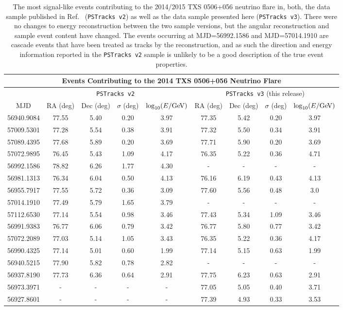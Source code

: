 \documentclass[aps,10pt,prd,twocolumn,floats,letterpaper,showpacs,nofootinbib,bibnotes,notitlepage,superscriptaddress,floatfix]{revtex4-1}
\newcommand{\MA}[1]{{\color{black}#1}}
\begin{document}
\begin{table}[p]
\centering
\begin{ruledtabular}
\begin{tabular}{c|cccc|cccc}
\multicolumn{9}{c}{Events Contributing to the 2014 TXS 0506+056 Neutrino Flare} \\[0.1cm]
\hline
\multicolumn{1}{c|}{} &
\multicolumn{4}{c|}{\MA{\tt PSTracks v2}~\cite{IceCube:2018cha,IceCube:2019}} & 
\multicolumn{4}{c}{\MA{\tt PSTracks v3} (this release)}\\[0.1cm]
MJD & RA (deg) & Dec (deg) & $\sigma$ (deg) & $\log_{10}(E/{\rm GeV})$ & RA (deg) & Dec (deg) & $\sigma$ (deg) & $\log_{10}(E/{\rm GeV})$\\ 
\hline
56940.9084 & 77.55 & 5.40 & 0.20 & 3.97 & 77.35 & 5.42 & 0.20 & 3.97\\
57009.5301 & 77.28 & 5.54 & 0.38 & 3.91 & 77.32 & 5.50 & 0.34 & 3.91\\
57089.4395 & 77.68 & 5.89 & 0.20 & 3.69 & 77.71 & 5.90 & 0.20 & 3.69\\
57072.9895 & 76.45 & 5.43 & 1.09 & 4.17 & 76.35 & 5.22 & 0.36 & 4.71\\
56992.1586 & 78.82 & 6.26 & 1.77 & 4.30 & - & - & - & - \\
56981.1313& 76.34 & 6.04 & 0.50 & 4.13 & 76.16 & 6.19 & 0.43 & 4.13 \\
56955.7917 & 77.55 & 5.72 & 0.36 & 3.09 & 77.60 & 5.56 & 0.48 & 3.0 \\
57014.1910 & 77.49 & 5.79 & 1.65 & 3.79 & - & - & - & -  \\
57112.6530 & 77.14 & 5.54 & 0.98 & 3.46 & 77.43 & 5.34 & 1.09 & 3.46 \\
56991.9383 & 76.77 & 6.06 & 0.79 & 3.42 & 76.77 & 5.80 & 0.77 & 3.42 \\
57072.2089 & 77.03 & 5.14 & 1.05 & 3.43 & 76.35 & 5.22 & 0.36 & 4.17 \\
56990.4325 & 77.14 & 5.01 & 0.60 & 1.99 & 77.14 & 5.15 & 0.63 & 1.99 \\
56940.5215 & 77.90 & 5.82 & 0.78 & 2.82 & - & - & - & - \\
56937.8190 & 77.73 & 6.36 & 0.64 & 2.91 & 77.75 & 6.23 & 0.63 & 2.91 \\
56973.3971 & - & - & - & - & 77.05 & 5.05 & 0.40 & 3.71 \\
56927.8601 & - & - & - & - & 77.39 & 4.93 & 0.33 & 3.53 \\
\end{tabular}
\end{ruledtabular}
\caption[]{The most signal-like events contributing to the 2014/2015 TXS 0506+056 neutrino flare in, both, the data sample published in Ref.~\cite{IceCube:2019} ({\tt PSTracks v2}) as well as the data sample presented here ({\tt PSTracks v3}). There were no changes to energy reconstruction between the two sample versions, but the angular reconstruction and sample event content have changed. The events occurring at MJD=56992.1586 and MJD=57014.1910 are cascade events that have been treated as tracks by the reconstruction, and as such the direction and energy information reported in the {\tt PSTracks v2} sample is unlikely to be a good description of the true event properties.}\label{tab:TXSFlareEvtsTable}
\end{table}
\end{document}
